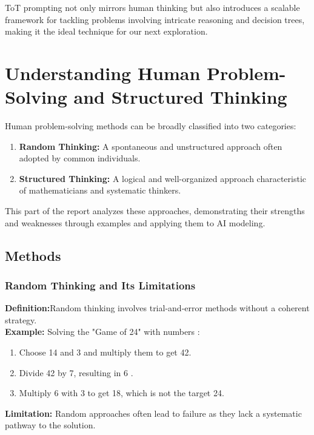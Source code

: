 \documentclass[12pt, a4paper]{article}
\begin{document}
ToT prompting not only mirrors human thinking but also introduces a scalable framework for tackling problems involving intricate reasoning and decision trees, making it the ideal technique for our next exploration.


\section{Understanding Human Problem-Solving and Structured Thinking}
Human problem-solving methods can be broadly classified into two categories:
\begin{enumerate}
    \item \textbf{Random Thinking:} A spontaneous and unstructured approach often adopted by common individuals.
    \item \textbf{Structured Thinking:} A logical and well-organized approach characteristic of mathematicians and systematic thinkers.
\end{enumerate}
    This part of the report analyzes these approaches, demonstrating their strengths and weaknesses through examples and applying them to AI modeling.
\subsection{Methods}
\subsubsection{Random Thinking and Its Limitations}
\textbf{Definition:}Random thinking involves trial-and-error methods without a coherent strategy.\\
\textbf{Example:}  Solving the "Game of 24" with numbers :
\begin{enumerate}
    \item Choose 14 and 3  and multiply them to get  42.
    \item Divide 42  by 7, resulting in 6 .
    \item Multiply 6 with 3 to get 18, which is not the target 24.
    
\end{enumerate}
\textbf{Limitation:} Random approaches often lead to failure as they lack a systematic pathway to the solution.
\end{document}

